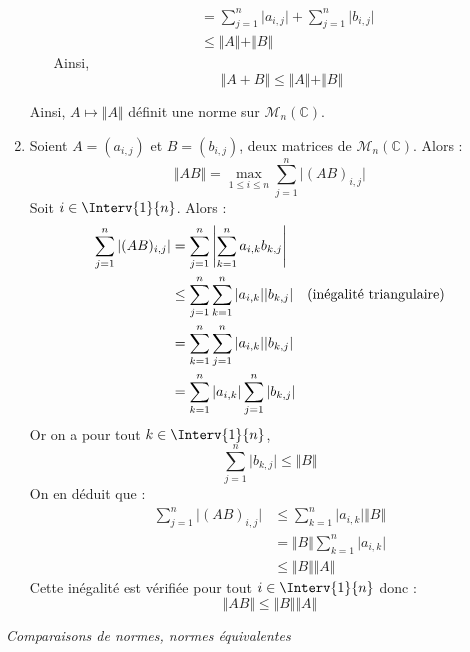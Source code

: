 \documentclass[a4paper,10pt]{report}
\begin{document}
\begin{enumerate}
\begin{itemize}
\begin{align*}
 & = \sum_{j=1}^n \vert a_{i,j} \vert + \sum_{j=1}^n \vert b_{i,j} \vert  \\
 & \leq \Vert A \Vert + \Vert B \Vert
 \end{align*}
Ainsi,
$$ \Vert A+B \Vert \leq \Vert A \Vert + \Vert B \Vert$$
\end{itemize}
Ainsi, $A \mapsto \Vert A \Vert$ définit une norme sur $\mathcal{M}_{n}(\mathbb{C})$.
\item Soient $A=(a_{i,j})$ et $B=(b_{i,j})$, deux matrices de $\mathcal{M}_n(\mathbb{C})$. Alors :
$$ \Vert AB \Vert = \max_{1 \leq i \leq n} \sum_{j=1}^n \vert (AB)_{i,j} \vert$$
Soit $i \in \Interv{1}{n}$. Alors :
\begin{align*}
\sum_{j=1}^n \vert (AB)_{i,j} \vert & = \sum_{j=1}^n \left\vert \sum_{k=1}^n a_{i,k} b_{k,j} \right\vert \\
& \leq  \sum_{j=1}^n  \sum_{k=1}^n \vert a_{i,k} \vert \vert b_{k,j} \vert \quad \hbox{(inégalité triangulaire)} \\
& = \sum_{k=1}^n  \sum_{j=1}^n \vert a_{i,k} \vert \vert b_{k,j} \vert  \\
& =  \sum_{k=1}^n \vert a_{i,k} \vert  \sum_{j=1}^n \vert b_{k,j} \vert  
\end{align*}
Or on a pour tout $k \in \Interv{1}{n}$,
$$ \sum_{j=1}^n \vert b_{k,j} \vert   \leq \Vert B \Vert$$
On en déduit que :
\begin{align*}
\sum_{j=1}^n \vert (AB)_{i,j} \vert  & \leq  \sum_{k=1}^n \vert a_{i,k} \vert \Vert B \Vert \\
& = \Vert B \Vert  \sum_{k=1}^n \vert a_{i,k} \vert \\
& \leq \Vert B \Vert \Vert A \Vert
\end{align*}
Cette inégalité est vérifiée pour tout $i \in \Interv{1}{n}$ donc :
$$ \Vert AB \Vert \leq \Vert B \Vert \Vert A \Vert$$
\end{enumerate}





\medskip

\begin{center}
\textit{{ {\large Comparaisons de normes, normes équivalentes}}}
\end{center}

\medskip
\end{document}
